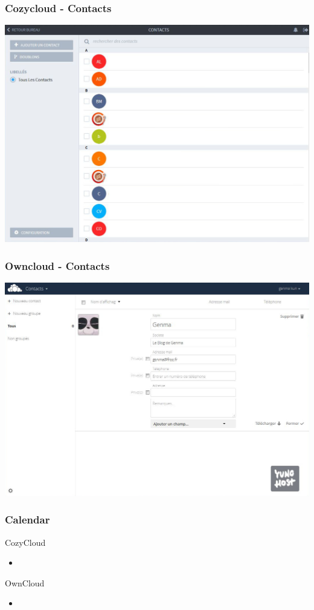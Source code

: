 \documentclass{beamer}
\begin{document}
\begin{frame}
\frametitle{Cozycloud - Contacts}
\includegraphics[scale=0.3] {./CozyCloud/CozyCloud_Contacts.jpg}
\end{frame}

\begin{frame}
\frametitle{Owncloud - Contacts}
\includegraphics[scale=0.3] {./Owncloud/Owncloud_Contacts.jpg}
\end{frame}

\begin{frame}
\frametitle{Calendar}

\begin{block}{CozyCloud}
\begin{itemize}
\item 
\end{itemize}
\end{block}

\begin{block}{OwnCloud}
\begin{itemize}
\item 
\end{itemize}
\end{block}
\end{frame}
\end{document}
